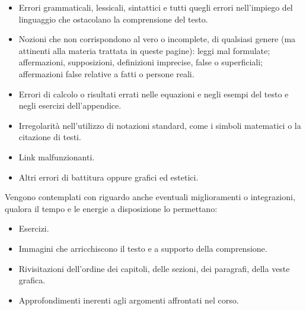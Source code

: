 \begin{itemize}
    \item Errori grammaticali, lessicali, sintattici e tutti quegli errori nell'impiego
    del linguaggio che ostacolano la comprensione del testo.

    \item Nozioni che non corrispondono al vero o incomplete, di qualsiasi genere (ma
    attinenti alla materia trattata in queste pagine):
    leggi mal formulate; affermazioni, supposizioni, definizioni imprecise, false o
    superficiali; affermazioni false relative a fatti o persone reali.

    \item Errori di calcolo o risultati errati nelle equazioni e negli esempi del testo e negli
    esercizi dell'appendice.

    \item Irregolarità nell'utilizzo di notazioni standard, come i simboli matematici
    o la citazione di testi.

    \item Link malfunzionanti.
    
    \item Altri errori di battitura oppure grafici ed estetici.
\end{itemize}

Vengono contemplati con riguardo anche eventuali miglioramenti o integrazioni,
qualora il tempo e le energie a disposizione lo permettano:

\begin{itemize}
    \item Esercizi.
    \item Immagini che arricchiscono il testo e a supporto della comprensione.
    \item Rivisitazioni dell'ordine dei capitoli, delle sezioni, dei paragrafi, della veste grafica.
    \item Approfondimenti inerenti agli argomenti affrontati nel corso.
\end{itemize}